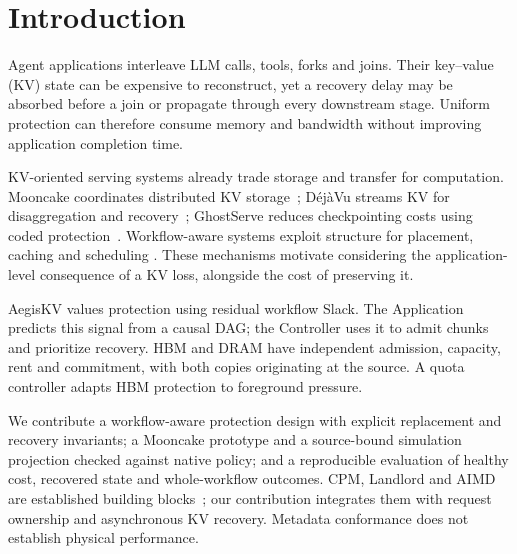 \section{Introduction}
Agent applications interleave LLM calls, tools, forks and joins. Their
key--value (KV) state can be expensive to reconstruct, yet a recovery delay
may be absorbed before a join or propagate through every downstream stage.
Uniform protection can therefore consume memory and bandwidth without
improving application completion time.

KV-oriented serving systems already trade storage and transfer for computation.
Mooncake coordinates distributed KV storage~\cite{qin2025mooncake};
D\'ej\`aVu streams KV for disaggregation and recovery~\cite{strati2024dejavu};
GhostServe reduces checkpointing costs using coded protection~\cite{jayakody2026ghostserve}.
Workflow-aware systems exploit structure for placement, caching and scheduling
\cite{lin2024parrot,pan2025kvflow,yu2026pythia}. These mechanisms motivate
considering the application-level consequence of a KV loss, alongside the
cost of preserving it.

AegisKV values protection using residual workflow Slack. The Application
predicts this signal from a causal DAG; the Controller uses it to admit
chunks and prioritize recovery. HBM and DRAM have independent admission,
capacity, rent and commitment, with both copies originating at the source.
A quota controller adapts HBM protection to foreground pressure.

We contribute a workflow-aware protection design with explicit replacement
and recovery invariants; a Mooncake prototype and a source-bound simulation
projection checked against native policy; and a reproducible evaluation of
healthy cost, recovered state and whole-workflow outcomes. CPM, Landlord and
AIMD are established building blocks~\cite{kelley1959cpm,young2002landlord,chiu1989aimd};
our contribution integrates them with request ownership and asynchronous KV
recovery. Metadata conformance does not establish physical performance.

